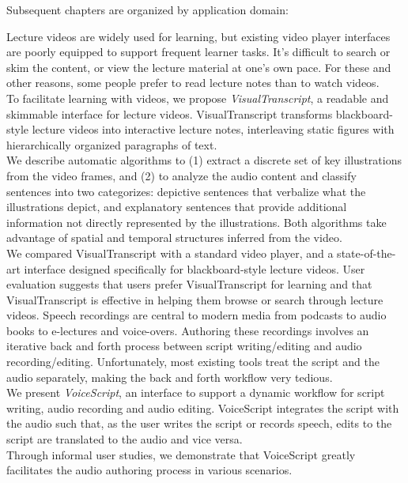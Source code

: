 Subsequent chapters are organized by application domain:
\begin{mldescription}
Lecture videos are widely used for learning, but existing
video player interfaces are poorly equipped to support frequent learner tasks. It's difficult to search or skim the content, or view the lecture material at one's own pace. For these and other reasons, some people prefer to read lecture notes than to watch videos.\\
To facilitate learning with videos, we propose \emph{VisualTranscript}, a readable and skimmable interface for lecture videos. VisualTranscript transforms blackboard-style lecture videos into interactive lecture notes, interleaving static figures with hierarchically organized paragraphs of text.\\
We describe automatic algorithms to (1) extract a discrete set of key illustrations from the video frames, and (2) to analyze the audio content and classify sentences into two categorizes: depictive sentences that verbalize what the illustrations depict, and explanatory sentences that provide additional information not directly represented by the illustrations. Both algorithms take advantage of spatial and temporal structures inferred from the video.\\
We compared VisualTranscript with a standard video player, and a state-of-the-art interface designed specifically for blackboard-style lecture videos. User evaluation suggests
that users prefer VisualTranscript for learning and that VisualTranscript is
effective in helping them browse or search through lecture videos.
%
Speech recordings are central to modern media from podcasts
to audio books to e-lectures and voice-overs. Authoring these
recordings involves an iterative back and forth process between
script writing/editing and audio recording/editing. Unfortunately, most
existing tools treat the script and the audio separately, making
the back and forth workflow very tedious.\\
We present \emph{VoiceScript}, an interface to support a dynamic workflow for script
writing, audio recording and audio editing. VoiceScript integrates the
script with the audio such that, as the user writes the script or
records speech, edits to the script are translated to the audio
and vice versa.\\
Through informal user studies, we demonstrate that VoiceScript greatly facilitates the audio authoring process in various scenarios.

\end{mldescription}
